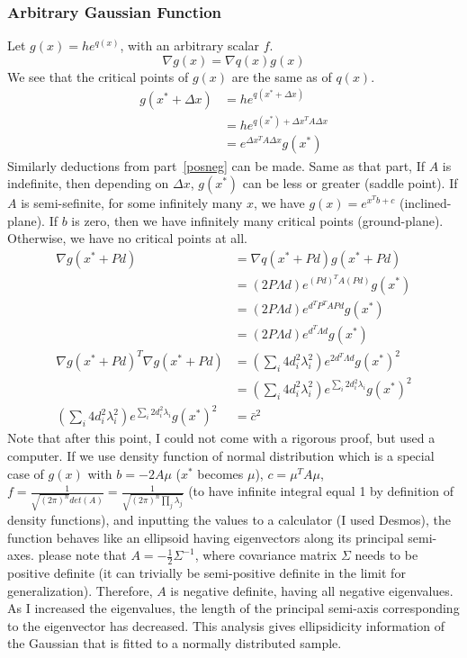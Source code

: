 \documentclass{article}
\numberwithin{equation}{subsection}
\begin{document}
\subsubsection{Arbitrary Gaussian Function}
Let $g(x) = he^{q(x)}$, with an arbitrary scalar $f$. 
\begin{equation}
    \nabla g(x) = \nabla q(x) g(x)
\end{equation}
We see that the critical points of $g(x)$ are the same as of $q(x)$. 
\begin{align}
    g(x^*+\Delta x) &= he^{q(x^*+\Delta x)}\\
     &= he^{q(x^*) + \Delta x^TA\Delta x}\\
     &= e^{\Delta x^TA\Delta x}g(x^*)
\end{align}
Similarly deductions from part~\ref{posneg} can be made. Same as that part, If $A$ is indefinite, then depending on $\Delta x$, $g(x^*)$ can be less or greater (saddle point). If $A$ is semi-sefinite, for some infinitely many $x$, we have $g(x) = e^{x^Tb+c}$ (inclined-plane). If $b$ is zero, then we have infinitely many critical points (ground-plane). Otherwise, we have no critical points at all.
\begin{align}
    \nabla g(x^*+Pd) &= \nabla q(x^*+Pd) g(x^*+Pd)\\
    &= (2P\Lambda d) e^{(Pd)^TA(Pd)}g(x^*)\\
    &= (2P\Lambda d) e^{d^TP^TAPd}g(x^*)\\
    &= (2P\Lambda d) e^{d^T\Lambda d}g(x^*)\\
    \nabla g(x^*+Pd)^T \nabla g(x^*+Pd) &= (\sum_i 4d_i^2\lambda_i^2)e^{2d^T\Lambda d}g(x^*)^2\\
    &= (\sum_i 4d_i^2\lambda_i^2)e^{\sum_i 2d_i^2\lambda_i}g(x^*)^2\\
    (\sum_i 4d_i^2\lambda_i^2)e^{\sum_i 2d_i^2\lambda_i}g(x^*)^2 &= \bar{c}^2
\end{align}
Note that after this point, I could not come with a rigorous proof, but used a computer.
If we use density function of normal distribution which is a special case of $g(x)$ with $b=-2A\mu$ ($x^*$ becomes $\mu$), $c=\mu^TA\mu$, $f = \frac{1}{\sqrt{(2\pi)^n}det(A)} = \frac{1}{\sqrt{(2\pi)^n\prod_j \lambda_j}}$ (to have infinite integral equal 1 by definition of density functions), and inputting the values to a calculator (I used Desmos), the function behaves like an ellipsoid having eigenvectors along its principal semi-axes. please note that $A=-\frac{1}{2}\Sigma^{-1}$, where covariance matrix $\Sigma$ needs to be positive definite (it can trivially be semi-positive definite in the limit for generalization). Therefore, $A$ is negative definite, having all negative eigenvalues. As I increased the eigenvalues, the length of the principal semi-axis corresponding to the eigenvector has decreased. 
This analysis gives ellipsidicity information of the Gaussian that is fitted to a normally distributed sample. 
\end{document}
